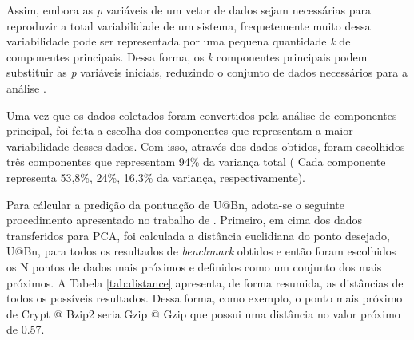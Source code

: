 Assim, embora as \textit{p} variáveis de um vetor de dados sejam necessárias para reproduzir a total variabilidade de um sistema, frequetemente muito dessa variabilidade pode ser representada por uma pequena quantidade \textit{k} de componentes principais. Dessa forma, os \textit{k} componentes principais podem substituir  as \textit{p} variáveis iniciais, reduzindo o conjunto de dados necessários para a análise \cite{johnson1988}.

Uma vez que os dados coletados foram convertidos pela análise de componentes principal, foi feita a escolha dos componentes que representam a maior variabilidade desses dados. Com isso, através dos dados obtidos, foram escolhidos três componentes que representam 94\% da variança total ( Cada componente representa 53,8\%, 24\%, 16,3\% da variança, respectivamente).

Para cálcular a predição da pontuação de U@Bn, adota-se o seguinte procedimento apresentado no trabalho de . Primeiro, em cima dos dados transferidos para PCA, foi calculada a distância euclidiana do ponto desejado, U@Bn, para todos os resultados de \textit{benchmark} obtidos e então foram escolhidos os N pontos de dados mais próximos e definidos como um conjunto dos mais próximos. A Tabela \ref{tab:distance} apresenta, de forma resumida, as distâncias de todos os possíveis resultados. Dessa forma, como exemplo, o ponto mais próximo de Crypt @ Bzip2 seria Gzip @ Gzip que possui uma distância no valor próximo de 0.57.

